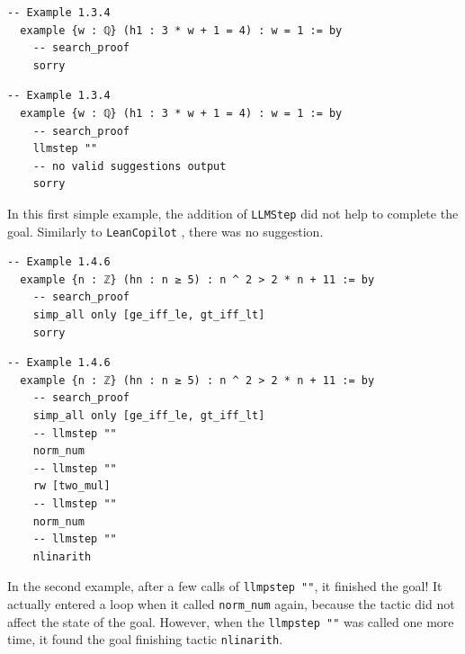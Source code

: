 \documentclass[12pt]{article}
\newcommand{\leancopilot}{\texttt{LeanCopilot} }
\newcommand{\llmstep}{\texttt{LLMStep} }
\begin{document}
\begin{minipage}{0.495\textwidth}
  \begin{lstlisting}[title={\leancopilot proof}]
  -- Example 1.3.4
  example {w : ℚ} (h1 : 3 * w + 1 = 4) : w = 1 := by
    -- search_proof
    sorry
  \end{lstlisting}
\end{minipage}
\vline
\begin{minipage}{0.495\textwidth}
  \begin{lstlisting}[title={\llmstep proof continuation}]
  -- Example 1.3.4
  example {w : ℚ} (h1 : 3 * w + 1 = 4) : w = 1 := by
    -- search_proof
    llmstep ""
    -- no valid suggestions output
    sorry
  \end{lstlisting}
\end{minipage}

In this first simple example, the addition of \llmstep did not help to complete the goal. Similarly to \leancopilot, there was no suggestion.

\begin{minipage}{0.495\textwidth}
  \begin{lstlisting}[title={\leancopilot proof}]
  -- Example 1.4.6
  example {n : ℤ} (hn : n ≥ 5) : n ^ 2 > 2 * n + 11 := by
    -- search_proof
    simp_all only [ge_iff_le, gt_iff_lt]
    sorry
  \end{lstlisting}
\end{minipage}
\vline
\begin{minipage}{0.495\textwidth}
  \begin{lstlisting}[title={\llmstep proof continuation}]
  -- Example 1.4.6
  example {n : ℤ} (hn : n ≥ 5) : n ^ 2 > 2 * n + 11 := by
    -- search_proof
    simp_all only [ge_iff_le, gt_iff_lt]
    -- llmstep ""
    norm_num
    -- llmstep ""
    rw [two_mul]
    -- llmstep ""
    norm_num
    -- llmstep ""
    nlinarith
  \end{lstlisting}
\end{minipage}

In the second example, after a few calls of \texttt{llmpstep ""}, it finished the goal! It actually entered a loop when it called \texttt{norm\_num} again, because the tactic did not affect the state of the goal. However, when the \texttt{llmpstep ""} was called one more time, it found the goal finishing tactic \texttt{nlinarith}.
\end{document}
